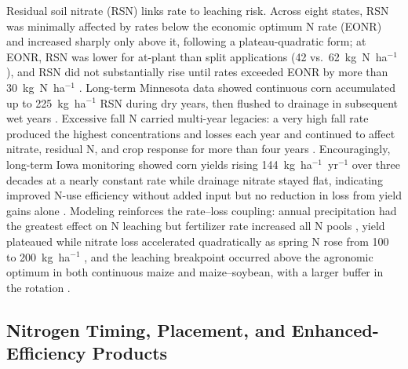 Residual soil nitrate (RSN) links rate to leaching risk. Across eight states, RSN was minimally affected by rates below the economic optimum N rate (EONR) and increased sharply only above it, following a plateau-quadratic form; at EONR, RSN was lower for at-plant than split applications (42 vs.\ 62~kg~N~ha$^{-1}$), and RSN did not substantially rise until rates exceeded EONR by more than 30~kg~N~ha$^{-1}$ \parencite{Bandura2025}. Long-term Minnesota data showed continuous corn accumulated up to 225~kg~ha$^{-1}$ RSN during dry years, then flushed to drainage in subsequent wet years \parencite{Randall2001}. Excessive fall N carried multi-year legacies: a very high fall rate produced the highest concentrations and losses each year and continued to affect nitrate, residual N, and crop response for more than four years \parencite{Jaynes2015}. Encouragingly, long-term Iowa monitoring showed corn yields rising 144~kg~ha$^{-1}$~yr$^{-1}$ over three decades at a nearly constant rate while drainage nitrate stayed flat, indicating improved N-use efficiency without added input but no reduction in loss from yield gains alone \parencite{Clifford2023}. Modeling reinforces the rate--loss coupling: annual precipitation had the greatest effect on N leaching but fertilizer rate increased all N pools \parencite{Li2006}, yield plateaued while nitrate loss accelerated quadratically as spring N rose from 100 to 200~kg~ha$^{-1}$ \parencite{Malone2007b}, and the leaching breakpoint occurred above the agronomic optimum in both continuous maize and maize--soybean, with a larger buffer in the rotation \parencite{Pasley2021}.

\subsection{Nitrogen Timing, Placement, and Enhanced-Efficiency Products}

